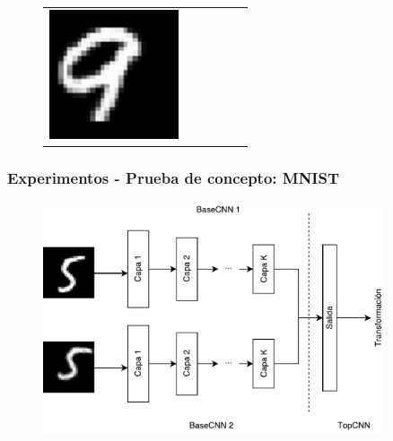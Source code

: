 \documentclass{beamer}
\begin{document}
\begin{frame}
\begin{figure}
{\begin{tabular}{cccccc}
\includegraphics[width = 1.5in]{./images/mnist/c1.png}\\
\end{tabular}
}
\label{fig:mnist-sample}
\end{figure}
\vfill

\end{frame}





\begin{frame}[plain]
\frametitle{Experimentos - Prueba de concepto: MNIST}
\begin{figure}
    \centering
    \includegraphics[width=0.9\textwidth]{images/siamese-example.pdf}
\end{figure}
\end{frame}
\end{document}
